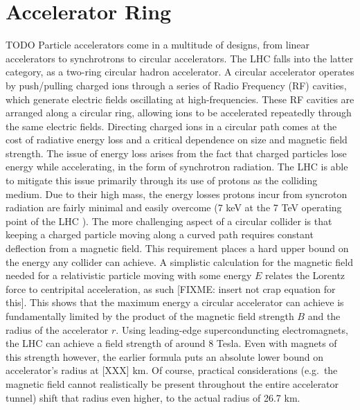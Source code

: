 \section{Accelerator Ring} TODO
    Particle accelerators come in a multitude of designs, from linear accelerators to synchrotrons to circular accelerators.
    The LHC falls into the latter category, as a two-ring circular hadron accelerator.
    A circular accelerator operates by push/pulling charged ions through a series of Radio Frequency (RF) cavities, which generate electric fields oscillating at high-frequencies.
    These RF cavities are arranged along a circular ring, allowing ions to be accelerated repeatedly through the same electric fields.
    Directing charged ions in a circular path comes at the cost of radiative energy loss and a critical dependence on size and magnetic field strength.
    The issue of energy loss arises from the fact that charged particles lose energy while accelerating, in the form of synchrotron radiation.
    The LHC is able to mitigate this issue primarily through its use of protons as the colliding medium.
    Due to their high mass, the energy losses protons incur from syncroton radiation are fairly minimal and easily overcome (7 keV at the 7 TeV operating point of the LHC \cite{lhc_machine}). %
    The more challenging aspect of a circular collider is that keeping a charged particle moving along a curved path requires constant deflection from a magnetic field.
    This requirement places a hard upper bound on the energy any collider can achieve.
    A simplistic calculation for the magnetic field needed for a relativistic particle moving with some energy $E$ relates the Lorentz force to centripital acceleration, as such [FIXME: insert not crap equation for this].
    This shows that the maximum energy a circular accelerator can achieve is fundamentally limited by the product of the magnetic field strength $B$ and the radius of the accelerator $r$.
    Using leading-edge superconduncting electromagnets, the LHC can achieve a field strength of around 8 Tesla.
    Even with magnets of this strength however, the earlier formula puts an absolute lower bound on accelerator's radius at [XXX] km.
    Of course, practical considerations (e.g.\ the magnetic field cannot realistically be present throughout the entire accelerator tunnel) shift that radius even higher, to the actual radius of 26.7 km.

